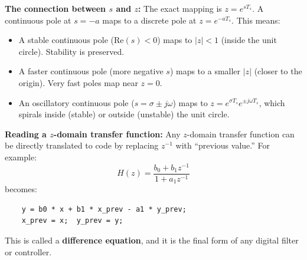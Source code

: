 \textbf{The connection between $s$ and $z$:} The exact mapping is $z = e^{sT_s}$. A continuous pole at $s = -a$ maps to a discrete pole at $z = e^{-aT_s}$. This means:
\begin{itemize}
    \item A stable continuous pole ($\text{Re}(s) < 0$) maps to $|z| < 1$ (inside the unit circle). Stability is preserved.
    \item A faster continuous pole (more negative $s$) maps to a smaller $|z|$ (closer to the origin). Very fast poles map near $z = 0$.
    \item An oscillatory continuous pole ($s = \sigma \pm j\omega$) maps to $z = e^{\sigma T_s} e^{\pm j\omega T_s}$, which spirals inside (stable) or outside (unstable) the unit circle.
\end{itemize}

\textbf{Reading a $z$-domain transfer function:} Any $z$-domain transfer function can be directly translated to code by replacing $z^{-1}$ with ``previous value.'' For example:
\[
H(z) = \frac{b_0 + b_1 z^{-1}}{1 + a_1 z^{-1}}
\]
becomes:
\begin{verbatim}
    y = b0 * x + b1 * x_prev - a1 * y_prev;
    x_prev = x;  y_prev = y;
\end{verbatim}
This is called a \textbf{difference equation}, and it is the final form of any digital filter or controller.
